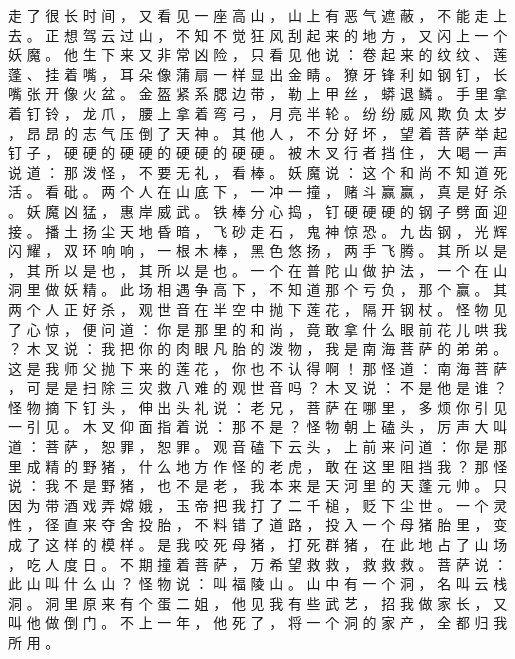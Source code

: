 {走 了 很 长 时 间 ， 又 看 见 一 座 高 山 ， 山 上 有 恶 气 遮 蔽 ， 不 能 走 上 去 。
正 想 驾 云 过 山 ， 不 知 不 觉 狂 风 刮 起 来 的 地 方 ， 又 闪 上 一 个 妖 魔 。
他 生 下 来 又 非 常 凶 险 ， 只 看 见 他 说 ： 卷 起 来 的 纹 纹 、 莲 蓬 、 挂 着 嘴 ， 耳 朵 像 蒲 扇 一 样 显 出 金 睛 。
獠 牙 锋 利 如 钢 钉 ， 长 嘴 张 开 像 火 盆 。
金 盔 紧 系 腮 边 带 ， 勒 上 甲 丝 ， 蟒 退 鳞 。
手 里 拿 着 钉 铃 ， 龙 爪 ， 腰 上 拿 着 弯 弓 ， 月 亮 半 轮 。
纷 纷 威 风 欺 负 太 岁 ， 昂 昂 的 志 气 压 倒 了 天 神 。
其 他 人 ， 不 分 好 坏 ， 望 着 菩 萨 举 起 钉 子 ， 硬 硬 的 硬 硬 的 硬 硬 的 硬 硬 。
被 木 叉 行 者 挡 住 ， 大 喝 一 声 说 道 ： 那 泼 怪 ， 不 要 无 礼 ， 看 棒 。
妖 魔 说 ： 这 个 和 尚 不 知 道 死 活 。
看 砒 。
两 个 人 在 山 底 下 ， 一 冲 一 撞 ， 赌 斗 赢 赢 ， 真 是 好 杀 。 妖 魔 凶 猛 ， 惠 岸 威 武 。
铁 棒 分 心 捣 ， 钉 硬 硬 硬 的 钢 子 劈 面 迎 接 。
播 土 扬 尘 天 地 昏 暗 ， 飞 砂 走 石 ， 鬼 神 惊 恐 。
九 齿 钢 ， 光 辉 闪 耀 ， 双 环 响 响 ， 一 根 木 棒 ， 黑 色 悠 扬 ， 两 手 飞 腾 。
其 所 以 是 ， 其 所 以 是 也 ， 其 所 以 是 也 。
一 个 在 普 陀 山 做 护 法 ， 一 个 在 山 洞 里 做 妖 精 。
此 场 相 遇 争 高 下 ， 不 知 道 那 个 亏 负 ， 那 个 赢 。
其 两 个 人 正 好 杀 ， 观 世 音 在 半 空 中 抛 下 莲 花 ， 隔 开 钢 杖 。
怪 物 见 了 心 惊 ， 便 问 道 ： 你 是 那 里 的 和 尚 ， 竟 敢 拿 什 么 眼 前 花 儿 哄 我 ？ 木 叉 说 ： 我 把 你 的 肉 眼 凡 胎 的 泼 物 ， 我 是 南 海 菩 萨 的 弟 弟 。
这 是 我 师 父 抛 下 来 的 莲 花 ， 你 也 不 认 得 啊 ！ 那 怪 道 ： 南 海 菩 萨 ， 可 是 是 扫 除 三 灾 救 八 难 的 观 世 音 吗 ？ 木 叉 说 ： 不 是 他 是 谁 ？ 怪 物 摘 下 钉 头 ， 伸 出 头 礼 说 ： 老 兄 ， 菩 萨 在 哪 里 ， 多 烦 你 引 见 一 引 见 。
木 叉 仰 面 指 着 说 ： 那 不 是 ？ 怪 物 朝 上 磕 头 ， 厉 声 大 叫 道 ： 菩 萨 ， 恕 罪 ， 恕 罪 。
观 音 磕 下 云 头 ， 上 前 来 问 道 ： 你 是 那 里 成 精 的 野 猪 ， 什 么 地 方 作 怪 的 老 虎 ， 敢 在 这 里 阻 挡 我 ？ 那 怪 说 ： 我 不 是 野 猪 ， 也 不 是 老 ， 我 本 来 是 天 河 里 的 天 蓬 元 帅 。
只 因 为 带 酒 戏 弄 嫦 娥 ， 玉 帝 把 我 打 了 二 千 槌 ， 贬 下 尘 世 。
一 个 灵 性 ， 径 直 来 夺 舍 投 胎 ， 不 料 错 了 道 路 ， 投 入 一 个 母 猪 胎 里 ， 变 成 了 这 样 的 模 样 。
是 我 咬 死 母 猪 ， 打 死 群 猪 ， 在 此 地 占 了 山 场 ， 吃 人 度 日 。
不 期 撞 着 菩 萨 ， 万 希 望 救 救 ， 救 救 救 。
菩 萨 说 ： 此 山 叫 什 么 山 ？ 怪 物 说 ： 叫 福 陵 山 。
山 中 有 一 个 洞 ， 名 叫 云 栈 洞 。
洞 里 原 来 有 个 蛋 二 姐 ， 他 见 我 有 些 武 艺 ， 招 我 做 家 长 ， 又 叫 他 做 倒 门 。
不 上 一 年 ， 他 死 了 ， 将 一 个 洞 的 家 产 ， 全 都 归 我 所 用 。
}
